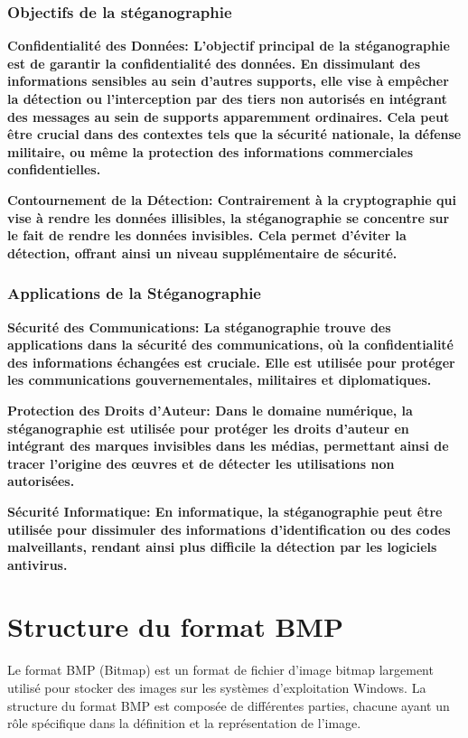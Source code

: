 \documentclass{article}
\begin{document}
\subsubsection{Objectifs de la stéganographie}
\bfseries Confidentialité des Données\normalfont : L'objectif principal de la stéganographie est de garantir la confidentialité des données. En dissimulant des informations sensibles au sein d'autres supports, elle vise à empêcher la détection ou l'interception par des tiers non autorisés en intégrant des messages au sein de supports apparemment ordinaires. Cela peut être crucial dans des contextes tels que la sécurité nationale, la défense militaire, ou même la protection des informations commerciales confidentielles.

\bfseries Contournement de la Détection\normalfont : Contrairement à la cryptographie qui vise à rendre les données illisibles, la stéganographie se concentre sur le fait de rendre les données invisibles. Cela permet d'éviter la détection, offrant ainsi un niveau supplémentaire de sécurité.

\subsubsection{Applications de la Stéganographie}
\bfseries Sécurité des Communications\normalfont : La stéganographie trouve des applications dans la sécurité des communications, où la confidentialité des informations échangées est cruciale. Elle est utilisée pour protéger les communications gouvernementales, militaires et diplomatiques.

\bfseries Protection des Droits d'Auteur\normalfont : Dans le domaine numérique, la stéganographie est utilisée pour protéger les droits d'auteur en intégrant des marques invisibles dans les médias, permettant ainsi de tracer l'origine des œuvres et de détecter les utilisations non autorisées.

\bfseries Sécurité Informatique\normalfont : En informatique, la stéganographie peut être utilisée pour dissimuler des informations d'identification ou des codes malveillants, rendant ainsi plus difficile la détection par les logiciels antivirus.
\section{Structure du format BMP}
Le format BMP (Bitmap) est un format de fichier d'image bitmap largement utilisé pour stocker des images sur les systèmes d'exploitation Windows. La structure du format BMP est composée de différentes parties, chacune ayant un rôle spécifique dans la définition et la représentation de l'image.
\end{document}
